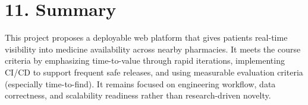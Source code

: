 \documentclass[
]{article}
\begin{document}
\section{\texorpdfstring{\textbf{11.
Summary}}{11. Summary}}\label{summary}

This project proposes a deployable web platform that gives patients
real-time visibility into medicine availability across nearby
pharmacies. It meets the course criteria by emphasizing time-to-value
through rapid iterations, implementing CI/CD to support frequent safe
releases, and using measurable evaluation criteria (especially
time-to-find). It remains focused on engineering workflow, data
correctness, and scalability readiness rather than research-driven
novelty.
\end{document}
